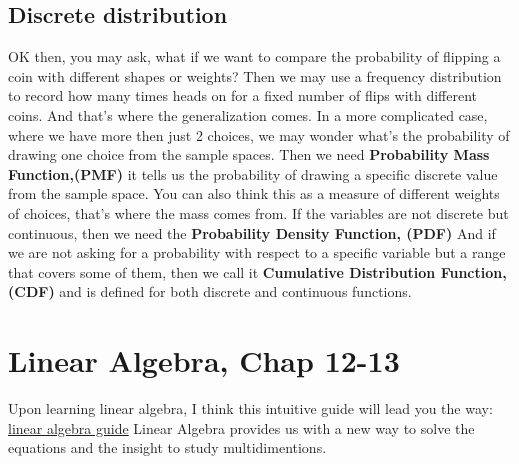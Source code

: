 \documentclass{article}
\begin{document}
\subsection{Discrete distribution}
OK then, you may ask, what if we want to compare the probability of flipping a coin with different shapes or weights? Then we may use a frequency distribution to record how many times heads on for a fixed number of flips with different coins. And that's where the generalization comes.
\newline In a more complicated case, where we have more then just 2 choices, we may wonder what's the probability of drawing one choice from the sample spaces. \newline  Then we need \textbf{Probability Mass Function,(PMF)} it tells us the probability of drawing a specific discrete value from the sample space. You can also think this as a measure of different weights of choices, that's where the mass comes from. 
\newline If the variables are not discrete but continuous, then we need the \textbf{Probability Density Function, (PDF)}
\newline And if we are not asking for a probability with respect to a specific variable but a range that covers some of them, then we call it \textbf{Cumulative Distribution Function, (CDF) } and is defined for both discrete and continuous functions.

\section{Linear Algebra, Chap 12-13}
Upon learning linear algebra, I think this intuitive guide will lead you the way: \hyperlink{https://betterexplained.com/articles/linear-algebra-guide/}{linear algebra guide}
\newline Linear Algebra provides us with a new way to solve the equations and the insight to study multidimentions.
\end{document}
